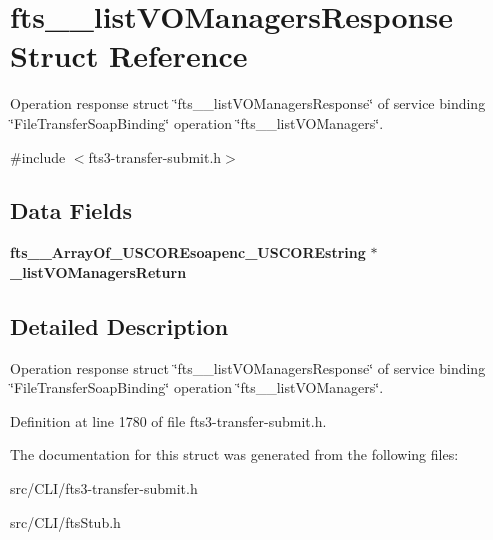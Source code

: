 \section{fts\_\-\_\-listVOManagersResponse Struct Reference}
\label{structfts____listVOManagersResponse}


Operation response struct \char`\"{}fts\_\-\_\-listVOManagersResponse\char`\"{} of service binding \char`\"{}FileTransferSoapBinding\char`\"{} operation \char`\"{}fts\_\-\_\-listVOManagers\char`\"{}.  




{\ttfamily \#include $<$fts3-\/transfer-\/submit.h$>$}

\subsection*{Data Fields}
\begin{DoxyCompactItemize}
\item 
{\bf fts\_\-\_\-ArrayOf\_\-USCOREsoapenc\_\-USCOREstring} $\ast$ {\bfseries \_\-listVOManagersReturn}\label{structfts____listVOManagersResponse_a5a94ca1c86419b42c4b7cfa9dd6168c6}

\end{DoxyCompactItemize}


\subsection{Detailed Description}
Operation response struct \char`\"{}fts\_\-\_\-listVOManagersResponse\char`\"{} of service binding \char`\"{}FileTransferSoapBinding\char`\"{} operation \char`\"{}fts\_\-\_\-listVOManagers\char`\"{}. 

Definition at line 1780 of file fts3-\/transfer-\/submit.h.



The documentation for this struct was generated from the following files:\begin{DoxyCompactItemize}
\item 
src/CLI/fts3-\/transfer-\/submit.h\item 
src/CLI/ftsStub.h\end{DoxyCompactItemize}
